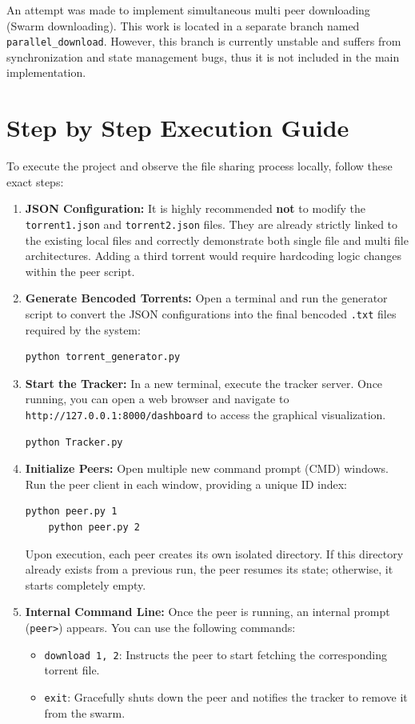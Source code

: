\documentclass[a4paper,12pt]{article}
\begin{document}
An attempt was made to implement simultaneous multi peer downloading (Swarm downloading). This work is located in a separate branch named \texttt{parallel\_download}. 
However, this branch is currently unstable and suffers from synchronization and state management bugs, thus it is not included in the main implementation.

\section{Step by Step Execution Guide}
To execute the project and observe the file sharing process locally, follow these exact steps:

\begin{enumerate}
    \item \textbf{JSON Configuration:} It is highly recommended \textbf{not} to modify the \texttt{torrent1.json} and \texttt{torrent2.json} files. 
    They are already strictly linked to the existing local files and correctly demonstrate both single file and multi file architectures. Adding a third 
    torrent would require hardcoding logic changes within the peer script.
    \item \textbf{Generate Bencoded Torrents:} Open a terminal and run the generator script to convert the JSON configurations into the final bencoded \texttt{.txt} files required by the system:
    \begin{lstlisting}[language=bash, numbers=none]
    python torrent_generator.py
    \end{lstlisting}
    \item \textbf{Start the Tracker:} In a new terminal, execute the tracker server. Once running, you can open a web browser and navigate to \texttt{http://127.0.0.1:8000/dashboard} to access the graphical visualization.
    \begin{lstlisting}[language=bash, numbers=none]
    python Tracker.py
    \end{lstlisting}
    \item \textbf{Initialize Peers:} Open multiple new command prompt (CMD) windows. Run the peer client in each window, providing a unique ID index:
    \begin{lstlisting}[language=bash, numbers=none]
    python peer.py 1
    python peer.py 2
    \end{lstlisting}
    Upon execution, each peer creates its own isolated directory. If this directory already exists from a previous run, the peer resumes its state; otherwise, it starts completely empty.
    \item \textbf{Internal Command Line:} Once the peer is running, an internal prompt (\texttt{peer>}) appears. You can use the following commands:
    \begin{itemize}
        \item \texttt{download 1, 2}: Instructs the peer to start fetching the corresponding torrent file.
        \item \texttt{exit}: Gracefully shuts down the peer and notifies the tracker to remove it from the swarm.
    \end{itemize}
\end{enumerate}
\end{document}
